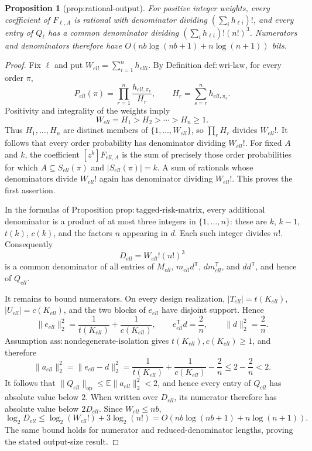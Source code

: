 \documentclass{article}
\newtheorem{proposition}{Proposition}
\begin{document}
\begin{proposition}[prop:rational-output]\label{prop:rational-output}
For positive integer weights, every coefficient of \(F_{\ell,A}\) is rational with denominator dividing \((\sum_i h_{\ell i})!\), and every entry of \(Q_{\ell}\) has a common denominator dividing \((\sum_i h_{\ell i})!(n!)^3\). Numerators and denominators therefore have \(O(nb\log(nb+1)+n\log(n+1))\) bits.
\end{proposition}
\begin{proof}
Fix \(\ell\) and put \(W_{ell}=\sum_{i=1}^n h_{ell i}\).  By Definition \(\mathrm{def:wri\mbox{-}law}\), for every order \(\pi\),
\[
 P_{ell}(\pi)
 =\prod_{r=1}^n
 \frac{h_{ell,\pi_r}}{H_r},
 \qquad
 H_r=\sum_{s=r}^n h_{ell,\pi_s}.
\]
Positivity and integrality of the weights imply
\[
 W_{ell}=H_1>H_2>\cdots>H_n\ge1.
\]
Thus \(H_1,\ldots,H_n\) are distinct members of \(\{1,\ldots,W_{ell}\}\), so \(\prod_rH_r\) divides \(W_{ell}!\).  It follows that every order probability has denominator dividing \(W_{ell}!\).  For fixed \(A\) and \(k\), the coefficient \([z^k]F_{ell,A}\) is the sum of precisely those order probabilities for which \(A\subseteq S_{ell}(\pi)\) and \(|S_{ell}(\pi)|=k\).  A sum of rationals whose denominators divide \(W_{ell}!\) again has denominator dividing \(W_{ell}!\).  This proves the first assertion.

In the formulas of Proposition \(\mathrm{prop:tagged\mbox{-}risk\mbox{-}matrix}\), every additional denominator is a product of at most three integers in \(\{1,\ldots,n\}\): these are \(k\), \(k-1\), \(t(k)\), \(c(k)\), and the factors \(n\) appearing in \(d\).  Each such integer divides \(n!\).  Consequently
\[
 D_{ell}=W_{ell}!(n!)^3
\]
is a common denominator of all entries of \(M_{ell}\), \(m_{ell}d^{\mathsf T}\), \(dm_{ell}^{\mathsf T}\), and \(dd^{\mathsf T}\), and hence of \(Q_{ell}\).

It remains to bound numerators.  On every design realization, \(|T_{ell}|=t(K_{ell})\), \(|U_{ell}|=c(K_{ell})\), and the two blocks of \(e_{ell}\) have disjoint support.  Hence
\[
 \|e_{ell}\|_2^2=\frac1{t(K_{ell})}+\frac1{c(K_{ell})},
 \qquad
 e_{ell}^{\mathsf T}d=\frac2n,
 \qquad
 \|d\|_2^2=\frac2n.
\]
Assumption \(\mathrm{ass:nondegenerate\mbox{-}isolation}\) gives \(t(K_{ell}),c(K_{ell})\ge1\), and therefore
\[
 \|a_{ell}\|_2^2
 =\|e_{ell}-d\|_2^2
 =\frac1{t(K_{ell})}+\frac1{c(K_{ell})}-\frac2n
 \le 2-\frac2n<2.
\]
It follows that \(\|Q_{ell}\|_{\mathrm{op}}\le\mathbb E\|a_{ell}\|_2^2<2\), and hence every entry of \(Q_{ell}\) has absolute value below \(2\).  When written over \(D_{ell}\), its numerator therefore has absolute value below \(2D_{ell}\).  Since \(W_{ell}\le nb\),
\[
 \log_2 D_{ell}
 \le \log_2(W_{ell}!)+3\log_2(n!)
 =O\!\left(nb\log(nb+1)+n\log(n+1)\right).
\]
The same bound holds for numerator and reduced-denominator lengths, proving the stated output-size result.
\end{proof}
\end{document}
